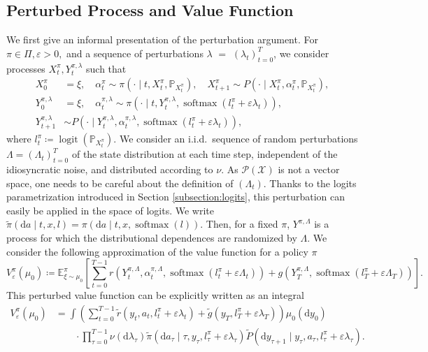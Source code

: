 \documentclass[11pt]{article}
\numberwithin{equation}{section}
\theoremstyle{definition}
\theoremstyle{remark}
\def\eps{\varepsilon}
\def\cX{\mathcal{X}}
\def\d{{\mathrm{d}}}
\DeclareMathOperator*{\logit}{logit}
\DeclareMathOperator*{\softmax}{softmax}
\begin{document}
\subsection{Perturbed Process and Value Function}
\label{subsection:perturbed-process}

We first give an informal presentation of the perturbation argument. For $\pi \in \Pi, \eps > 0,$ and a sequence of perturbations $\lambda$ $=$ $(\lambda_t)_{t = 0}^{T }$, we consider processes $X^\pi_t, Y^{\pi, \lambda}_t$ such that
\begin{equation}
\label{eq:perturbed-process}
\begin{aligned}
X^{\pi}_0 &= \xi, \quad \alpha^{\pi}_t \sim \pi(\cdot \mid t, X^{\pi}_t, \mathbb P_{X_t^{\pi}}),  \quad X^{\pi}_{t + 1} \sim P( \cdot \mid X^{\pi}_t, \alpha^{\pi}_t, \mathbb P_{X_t^\pi}), \\
Y^{\pi,\lambda}_0 &= \xi,\quad  \alpha_{t}^{\pi, \lambda} \sim \pi (\cdot \mid t, Y_t^{\pi, \lambda}, \softmax (l_t^\pi + \eps \lambda_t)), \\ Y_{t + 1}^{\pi, \lambda} &\sim P(\cdot \mid Y_t^{\pi, \lambda}, \alpha_t^{\pi, \lambda}, \softmax (l_t^\pi + \eps \lambda_t)),
\end{aligned}
\end{equation}
where $l_t^\pi \coloneq \logit(\mathbb P_{X_t^\pi})$.
We consider an i.i.d.\ sequence of random perturbations $\Lambda = (\Lambda_t)_{t = 0}^{T}$ of the state distribution at each time step, independent of the idiosyncratic noise, and distributed according to $\nu$. 
As $\mathcal P (\cX)$ is not a vector space, one needs to be careful about the definition of $(\Lambda_t)$. Thanks to the logits parametrization introduced in Section \ref{subsection:logits}, this perturbation can easily be applied in the space of logits. We write $\tilde \pi ( \d a \mid t,x, l) = \pi (\d a \mid t,x, \softmax (l))$. Then, for a fixed $\pi$, $Y^{\pi, \Lambda}$ is a process for which the distributional dependences are randomized by $\Lambda$.
We consider the following approximation of the value function for a policy $\pi$
\begin{equation}\label{eq:def-perturbed-value-function}
    V_{\eps}^{\pi}(\mu_0) \coloneq \mathbb E^{\pi}_{\xi \sim \mu_0} \left[ \sum_{t = 0}^{T - 1} r(Y_t^{\pi, \Lambda}, \alpha^{\pi,\Lambda}_t, \softmax(l_t^\pi + \eps \Lambda_t)) + g(Y^{\pi, \Lambda}_T, \softmax (l_T^\pi + \eps \Lambda_T))\right].
\end{equation}
This perturbed value function can be explicitly written as an integral
\[
\begin{aligned}
    V_{\eps}^{\pi}(\mu_0) &= \int \left(\sum_{t = 0}^{T - 1} \tilde r(y_t, a_t,l^\pi_t + \eps \lambda_t) + \tilde g(y_T, l_T^\pi + \eps \lambda_T) \right) \mu_0(\d y_0)  \\
    & \qquad \cdot \prod_{\tau = 0}^{T - 1} \nu (\d \lambda_\tau)\tilde \pi (\d a_\tau \mid \tau,y_\tau, l^\pi_\tau + \eps \lambda_\tau) 
    \tilde P (\d y_{\tau + 1} \mid y_\tau, a_\tau, l^\pi_\tau + \eps \lambda_\tau).
\end{aligned}
\]
\end{document}
